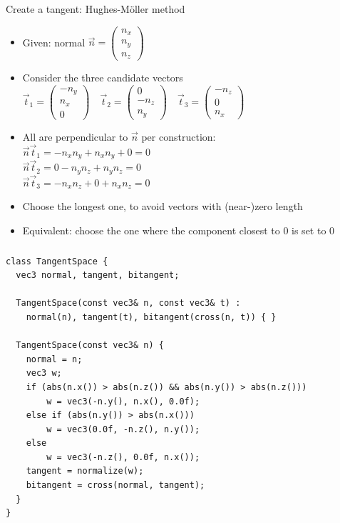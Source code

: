 \documentclass[utf8,stillsansserifmath,fleqn,t]{beamer}
\begin{document}
\begin{frame}[label=tangentspace-2]
\frametitle{\insertsection}
Create a tangent: Hughes-Möller method
\begin{itemize}
\item Given: normal $\vec{n} = \begin{pmatrix}n_x\\ n_y\\ n_z\end{pmatrix}$
\item Consider the three candidate vectors\\
$\vec{t}_1 = \begin{pmatrix}-n_y \\ n_x \\ 0\end{pmatrix}\quad
 \vec{t}_2 = \begin{pmatrix}0 \\ -n_z \\ n_y\end{pmatrix}\quad
 \vec{t}_3 = \begin{pmatrix}-n_z \\ 0 \\ n_x\end{pmatrix}$
\item All are perpendicular to $\vec{n}$ per construction:\\
$\vec{n}\vec{t}_1 = - n_x n_y + n_x n_y + 0 = 0$\\
$\vec{n}\vec{t}_2 = 0 - n_y n_z  + n_y n_z  = 0$\\
$\vec{n}\vec{t}_3 = - n_x n_z + 0 + n_x n_z = 0$
\item Choose the longest one, to avoid vectors with (near-)zero length
\item Equivalent: choose the one where the component closest to 0 is set to 0
\end{itemize}
\end{frame}

\begin{frame}[fragile]
\frametitle{\insertsection}
\begin{lstlisting}
class TangentSpace {
  vec3 normal, tangent, bitangent;

  TangentSpace(const vec3& n, const vec3& t) :
    normal(n), tangent(t), bitangent(cross(n, t)) { }

  TangentSpace(const vec3& n) {
    normal = n;
    vec3 w;
    if (abs(n.x()) > abs(n.z()) && abs(n.y()) > abs(n.z()))
        w = vec3(-n.y(), n.x(), 0.0f);
    else if (abs(n.y()) > abs(n.x()))
        w = vec3(0.0f, -n.z(), n.y());
    else
        w = vec3(-n.z(), 0.0f, n.x());
    tangent = normalize(w);
    bitangent = cross(normal, tangent);
  }
}
\end{lstlisting}
\end{frame}
\end{document}
